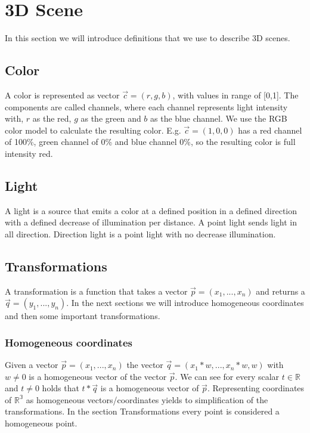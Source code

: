 \section{3D Scene}\label{d-scene}

In this section we will introduce definitions that we use to describe 3D
scenes.

\subsection{Color}\label{color}

A color is represented as vector $\vec{c} = (r,g,b)$, with values in
range of {[}0,1{]}. The components are called channels, where each
channel represents light intensity with, $r$ as the red, $g$ as the
green and $b$ as the blue channel. We use the RGB color model to
calculate the resulting color. E.g. $\vec{c} =(1, 0, 0)$ has a red
channel of 100\%, green channel of 0\% and blue channel 0\%, so the
resulting color is full intensity red.

\subsection{Light}\label{light}

A light is a source that emits a color at a defined position in a
defined direction with a defined decrease of illumination per distance.
A point light sends light in all direction. Direction light is a point
light with no decrease illumination.

\subsection{Transformations}\label{transformations}

A transformation is a function that takes a vector
$\vec{p} = (x_1,...,x_n)$ and returns a $\vec{q} = (y_1,...,y_n)$. In
the next sections we will introduce homogeneous coordinates and then
some important transformations.

\subsubsection{Homogeneous coordinates}\label{homogeneous-coordinates}

Given a vector $\vec{p}=(x_1,...,x_n)$ the vector
$\vec{q}=(x_1 * w, ..., x_n * w, w)$ with $w \ne 0$ is a homogeneous
vector of the vector $\vec{p}$. We can see for every scalar
$t \in \mathbb{R}$ and $t \ne 0$ holds that $t*\vec{q}$ is a homogeneous
vector of $\vec{p}$. Representing coordinates of $\mathbb{R^3}$ as
homogeneous vectors/coordinates yields to simplification of the
transformations. In the section Transformations every point is
considered a homogeneous point.

